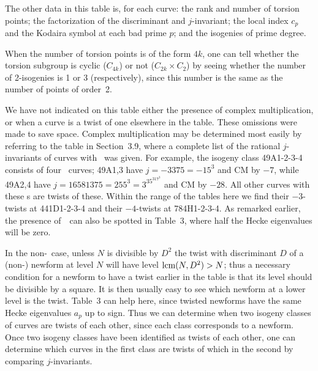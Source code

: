 The other data in this table is, for each curve: the rank and number of 
torsion points; the factorization of the discriminant and $j$-invariant; 
the local index $c_p$ and the Kodaira symbol at each bad prime $p$; and 
the isogenies of prime degree.

When the number of torsion points is of the form $4k$,
one can tell whether the torsion subgroup is cyclic ($C_{4k}$) or not
($C_{2k}\times C_2$) by seeing whether the number of 2-isogenies is 1
or 3 (respectively), since this number is the same as the number of
points of order~2.

We have not indicated on this table either the presence of complex
multiplication, or when a curve is a twist of one elsewhere in the
table.  These omissions were made to save space.  Complex
multiplication may be determined most easily by referring to the table
in Section~3.9, where a complete list of the rational
$j$-invariants of curves with \CM\ was given.  For example, the
isogeny class 49A1-2-3-4 consists of four \CM\ curves; 49A1,3 have
$j=-3375=-15^3$ and CM by $-7$, while 49A2,4 have
$j=16581375=255^3=3^35^317^3$ and CM by $-28$.  All other curves with
these \CM s are twists of these.  Within the range of the tables here
we find their $-3$-twists at 441D1-2-3-4 and their $-4$-twists at
784H1-2-3-4.  As remarked earlier, the presence of~\CM\ can also be spotted in
Table~3, where half the Hecke eigenvalues will be zero.

In the non-\CM\ case, unless $N$ is divisible by $D^2$ the twist with
discriminant $D$ of a (non-\CM) newform at level $N$ will have level
$\hbox{\rm lcm}(N,D^2)>N$; thus a necessary condition for a newform to have a
twist earlier in the table is that its level should be divisible by a
square.  It is then usually easy to see which newform at a lower level
is the twist.  Table~3 can help here, since twisted newforms have the
same Hecke eigenvalues $a_p$ up to sign.  Thus we can determine when
two isogeny classes of curves are twists of each other, since each
class corresponds to a newform.  Once two isogeny classes have been
identified as twists of each other, one can determine which curves in
the first class are twists of which in the second by comparing
$j$-invariants.

